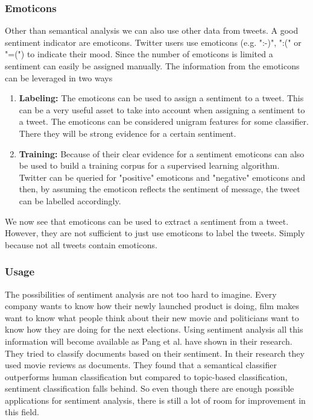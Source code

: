 \documentclass{article}
\begin{document}
\subsubsection{Emoticons}
Other than semantical analysis we can also use other data from tweets. A good sentiment indicator are emoticons. Twitter users use emoticons (e.g. ":-)", ":(" or "=(") to indicate their mood.\cite{twitterSentiment} Since the number of emoticons is limited a sentiment can easily be assigned manually. The information from the emoticons can be leveraged in two ways
\begin{enumerate}
\item \textbf{Labeling:} The emoticons can be used to assign a sentiment to a tweet. This can be a very useful asset to take into account when assigning a sentiment to a tweet. The emoticons can be considered unigram features for some classifier. There they will be strong evidence for a certain sentiment.
\item \textbf{Training:} Because of their clear evidence for a sentiment emoticons can also be used to build a training corpus for a supervised learning algorithm. Twitter can be queried for "positive" emoticons and "negative" emoticons and then, by assuming the emoticon reflects the sentiment of message, the tweet can be labelled accordingly.\cite{moodLens} 
\end{enumerate}
We now see that emoticons can be used to extract a sentiment from a tweet. However, they are not sufficient to just use emoticons to label the tweets. Simply because not all tweets contain emoticons.
\subsubsection{Usage}
The possibilities of sentiment analysis are not too hard to imagine. Every company wants to know how their newly launched product is doing, film makes want to know what people think about their new movie and politicians want to know how they are doing for the next elections. Using sentiment analysis all this information will become available as Pang et al. \cite{machineLearning} have shown in their research. They tried to classify documents based on their sentiment. In their research they used movie reviews as documents. They found that a semantical classifier outperforms human classification but compared to topic-based classification, sentiment classification falls behind. So even though there are enough possible applications for sentiment analysis, there is still a lot of room for improvement in this field.
\end{document}
